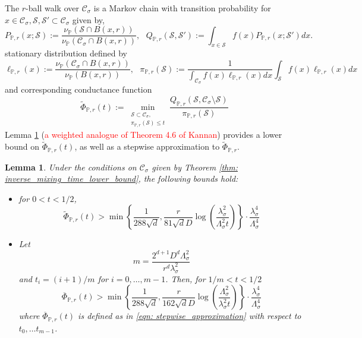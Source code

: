 \documentclass{article}
\newcommand{\1}{\mathbf{1}}
\newcommand{\Pbb}{\mathbb{P}}
\newcommand{\Sset}{\mathcal{S}}
\newcommand{\Cset}{\mathcal{C}}
\newcommand{\Csig}{\Cset_{\sigma}}
\theoremstyle{aldenthm}
\newtheorem{lemma}{Lemma}
\begin{document}
The $r$-ball walk over $\Csig$ is a Markov chain with transition probability for $x \in \Csig, \Sset, \Sset' \subset \Csig$ given by,
\begin{equation*}
P_{\Pbb, r}(x;\Sset) := \frac{\nu_\Pbb(\Sset \cap B(x,r))}{\nu_\Pbb(\Csig \cap B(x,r))}, ~~~ Q_{\Pbb, r}(\Sset, \Sset') := \int_{x \in \Sset} f(x) P_{\Pbb, r}(x;\Sset') dx. 
\end{equation*}
stationary distribution defined by
\begin{equation*}
\ell_{\Pbb,r}(x) := \frac{\nu_\Pbb(\Csig \cap B(x,r))}{\nu_{\Pbb}(B(x,r))}, ~~~ \pi_{\Pbb,r}(\Sset) := \frac{1}{\int_{\Csig} f(x) \ell_{\Pbb,r}(x) dx} \int_{\Sset} f(x) \ell_{\Pbb,r}(x) dx
\end{equation*}
and corresponding conductance function
\begin{equation*}
\widetilde{\Phi}_{\Pbb,r}(t) := \min_{\substack{\Sset \subset \Csig, \\ \pi_{\Pbb,r}(\Sset) \leq t} } \frac{Q_{\Pbb,r}(\Sset, \Csig \setminus \Sset)}{\pi_{\Pbb,r}(\Sset)}
\end{equation*}
Lemma \ref{lem: continuous_conductance_lb} (\textcolor{red}{a weighted analogue of Theorem 4.6 of Kannan}) provides a lower bound on $\widetilde{\Phi}_{\Pbb, r}(t)$, as well as a stepwise approximation to $\widetilde{\Phi}_{\Pbb, r}$.
\begin{lemma}
	\label{lem: continuous_conductance_lb}
	Under the conditions on $\Csig$ given by Theorem \ref{thm: inverse_mixing_time_lower_bound}, the following bounds hold: 
	\begin{itemize}
		\item 
		for $0 < t < 1/2$,
		\begin{equation*}
		\widetilde{\Phi}_{\Pbb,r}(t) > \min\left\{\frac{1}{288\sqrt{d}},\frac{r}{81 \sqrt{d}D}\log\left(\frac{\lambda_{\sigma}^2}{\Lambda_{\sigma}^2 t}\right)\right\} \cdot \frac{\lambda_{\sigma}^4}{\Lambda_{\sigma}^4}
		\end{equation*}
		\item
		Let
		\begin{equation*}
		m = \frac{2^{d+1}D^d \Lambda_{\sigma}^2}{r^d \lambda_{\sigma}^2}
		\end{equation*}
		 and $t_i = (i + 1)/m$ for $i = 0, \ldots, m - 1$. Then, for $1/m < t < 1/2$
		\begin{equation*}
		\overline{\Phi}_{\Pbb,r}(t) > \min\left\{\frac{1}{288\sqrt{d}},\frac{r}{162 \sqrt{d}D}\log\left(\frac{\Lambda_{\sigma}^2}{\lambda_{\sigma}^2 t}\right)\right\} \cdot \frac{\lambda_{\sigma}^4}{\Lambda_{\sigma}^4}
		\end{equation*}
		where $\overline{\Phi}_{\Pbb,r}(t)$ is defined as in \eqref{eqn: stepwise_approximation} with respect to $t_0, \ldots t_{m - 1}$. 
	\end{itemize}
	
\end{lemma}
\end{document}
